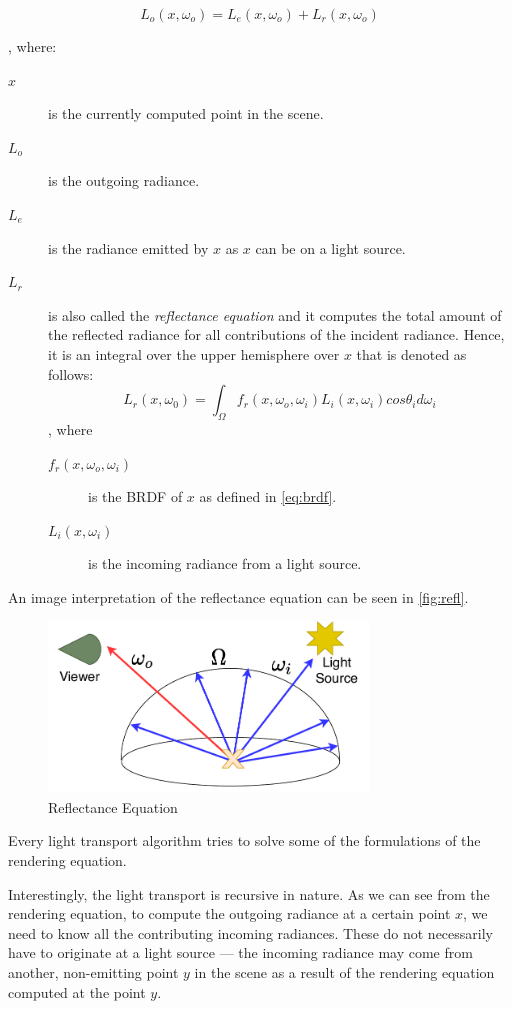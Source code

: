 \begin{equation}
L_o(x,\omega_o)=L_e(x,\omega_o)+L_r(x,\omega_o)
\end{equation}

, where:
\begin{description}
	\item[$x$] is the currently computed point in the scene.
	\item[$L_o$] is the outgoing radiance.
	\item[$L_e$] is the radiance emitted by $x$ as $x$ can be on a light source.
	\item[$L_r$] is also called the \emph{reflectance equation} and it computes the total amount of the reflected radiance for all contributions of the incident radiance. Hence, it is an integral over the upper hemisphere over $x$ that is denoted as follows:
	\begin{equation}
	L_r(x,\omega_0)=\int_{\Omega}f_r(x,\omega_o,\omega_i) L_i(x,\omega_i) cos\theta_i d\omega_i
	\end{equation}
	, where
	\begin{description}
		\item[$f_r(x,\omega_o,\omega_i)$] is the BRDF of $x$ as defined in \autoref{eq:brdf}.
		\item[$L_i(x,\omega_i)$] is the incoming radiance from a light source.
	\end{description}
\end{description}

An image interpretation of the reflectance equation can be seen in \autoref{fig:refl}.

\begin{figure}[h]
	\centering
	\includegraphics[width=85mm]{img/refl.pdf}
	\caption{Reflectance Equation}
	\label{fig:refl}
\end{figure}

Every light transport algorithm tries to solve some of the formulations of the rendering equation.

Interestingly, the light transport is recursive in nature. As we can see from the rendering equation, to compute the outgoing radiance at a certain point $x$, we need to know all the contributing incoming radiances. These do not necessarily have to originate at a light source --- the incoming radiance may come from another, non-emitting point $y$ in the scene as a result of the rendering equation computed at the point $y$.

